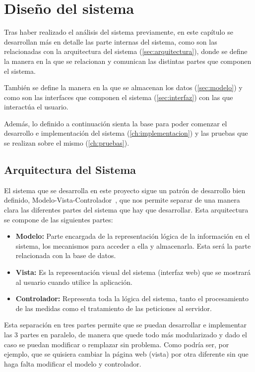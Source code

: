 \chapter{Diseño del sistema}
\label{ch:diseno}
Tras haber realizado el análisis del sistema previamente, en este capítulo se desarrollan más en detalle las parte internas del sistema, como son las relacionadas con la arquitectura del sistema (\autoref{sec:arquitectura}), donde se define la manera en la que se relacionan y comunican las distintas partes que componen el sistema. 

También se define la manera en la que se almacenan los datos (\autoref{sec:modelo}) y como son las interfaces que componen el sistema (\autoref{sec:interfaz}) con las que interactúa el usuario. 

Además, lo definido a continuación sienta la base para poder comenzar el desarrollo e implementación del sistema (\autoref{ch:implementacion}) y las pruebas que se realizan sobre el mismo (\autoref{ch:pruebas}).

\section{Arquitectura del Sistema}\label{sec:arquitectura}
El sistema que se desarrolla en este proyecto sigue un patrón de desarrollo bien definido, Modelo-Vista-Controlador~\cite{bucanek_model-view-controller_2009,noauthor_mvc_nodate}, que nos permite separar de una manera clara las diferentes partes del sistema que hay que desarrollar. Esta arquitectura se compone de las siguientes partes:
\begin{itemize}
	\item \textbf{Modelo:} Parte encargada de la representación lógica de la información en el sistema, los mecanismos para acceder a ella y almacenarla. Esta será la parte relacionada con la base de datos.
	\item \textbf{Vista:} Es la representación visual del sistema (interfaz web) que se mostrará al usuario cuando utilice la aplicación.
	\item \textbf{Controlador:} Representa toda la lógica del sistema, tanto el procesamiento de las medidas como el tratamiento de las peticiones al servidor.
\end{itemize}

Esta separación en tres partes permite que se puedan desarrollar e implementar las 3 partes en paralelo, de manera que quede todo más modularizado y dado el caso se puedan modificar o remplazar sin problema. Como podría ser, por ejemplo, que se quisiera cambiar la página web (vista) por otra diferente sin que haga falta modificar el modelo y controlador. 

